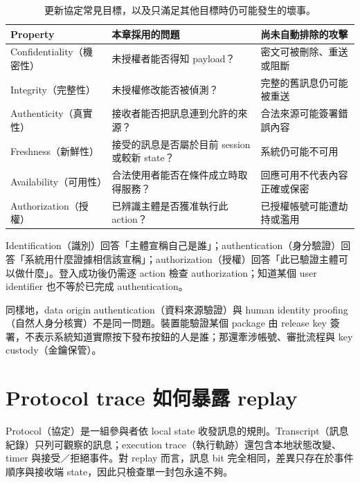 \documentclass[11pt,a4paper,oneside,openany]{book}
\begin{document}
\begin{table}[htbp]
\centering
\caption{更新協定常見目標，以及只滿足其他目標時仍可能發生的壞事。}
\label{tab:security-goals}
\begin{tabularx}{\textwidth}{@{}lYY@{}}
\toprule
Property & 本章採用的問題 & 尚未自動排除的攻擊 \\
\midrule
Confidentiality（機密性） & 未授權者能否得知 payload？ & 密文可被刪除、重送或阻斷 \\
Integrity（完整性） & 未授權修改能否被偵測？ & 完整的舊訊息仍可能被重送 \\
Authenticity（真實性） & 接收者能否把訊息連到允許的來源？ & 合法來源可能簽署錯誤內容 \\
Freshness（新鮮性） & 接受的訊息是否屬於目前 session 或較新 state？ & 系統仍可能不可用 \\
Availability（可用性） & 合法使用者能否在條件成立時取得服務？ & 回應可用不代表內容正確或保密 \\
Authorization（授權） & 已辨識主體是否獲准執行此 action？ & 已授權帳號可能遭劫持或濫用 \\
\bottomrule
\end{tabularx}
\end{table}

Identification（識別）回答「主體宣稱自己是誰」；authentication（身分驗證）回答「系統用什麼證據相信該宣稱」；authorization（授權）回答「此已驗證主體可以做什麼」。登入成功後仍需逐 action 檢查 authorization；知道某個 user identifier 也不等於已完成 authentication。

同樣地，data origin authentication（資料來源驗證）與 human identity proofing（自然人身分核實）不是同一問題。裝置能驗證某個 package 由 release key 簽署，不表示系統知道實際按下發布按鈕的人是誰；那還牽涉帳號、審批流程與 key custody（金鑰保管）。

\section{Protocol trace 如何暴露 replay}
Protocol（協定）是一組參與者依 local state 收發訊息的規則。Transcript（訊息紀錄）只列可觀察的訊息；execution trace（執行軌跡）還包含本地狀態改變、timer 與接受／拒絕事件。對 replay 而言，訊息 bit 完全相同，差異只存在於事件順序與接收端 state，因此只檢查單一封包永遠不夠。
\end{document}
